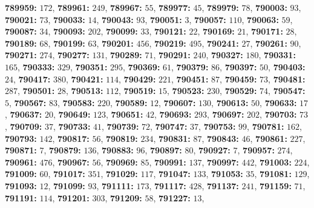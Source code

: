 \textsf{\bfseries 789959:} $172$, \textsf{\bfseries 789961:} $249$, \textsf{\bfseries 789967:} $55$, \textsf{\bfseries 789977:} $45$, \textsf{\bfseries 789979:} $78$, \textsf{\bfseries 790003:} $93$, \textsf{\bfseries 790021:} $73$, \textsf{\bfseries 790033:} $14$, \textsf{\bfseries 790043:} $93$, \textsf{\bfseries 790051:} $3$, \textsf{\bfseries 790057:} $110$, \textsf{\bfseries 790063:} $59$, \textsf{\bfseries 790087:} $34$, \textsf{\bfseries 790093:} $202$, \textsf{\bfseries 790099:} $33$, \textsf{\bfseries 790121:} $22$, \textsf{\bfseries 790169:} $21$, \textsf{\bfseries 790171:} $28$, \textsf{\bfseries 790189:} $68$, \textsf{\bfseries 790199:} $63$, \textsf{\bfseries 790201:} $456$, \textsf{\bfseries 790219:} $495$, \textsf{\bfseries 790241:} $27$, \textsf{\bfseries 790261:} $90$, \textsf{\bfseries 790271:} $274$, \textsf{\bfseries 790277:} $131$, \textsf{\bfseries 790289:} $71$, \textsf{\bfseries 790291:} $240$, \textsf{\bfseries 790327:} $180$, \textsf{\bfseries 790331:} $165$, \textsf{\bfseries 790333:} $329$, \textsf{\bfseries 790351:} $295$, \textsf{\bfseries 790369:} $61$, \textsf{\bfseries 790379:} $86$, \textsf{\bfseries 790397:} $50$, \textsf{\bfseries 790403:} $24$, \textsf{\bfseries 790417:} $380$, \textsf{\bfseries 790421:} $114$, \textsf{\bfseries 790429:} $221$, \textsf{\bfseries 790451:} $87$, \textsf{\bfseries 790459:} $73$, \textsf{\bfseries 790481:} $287$, \textsf{\bfseries 790501:} $28$, \textsf{\bfseries 790513:} $112$, \textsf{\bfseries 790519:} $15$, \textsf{\bfseries 790523:} $230$, \textsf{\bfseries 790529:} $74$, \textsf{\bfseries 790547:} $5$, \textsf{\bfseries 790567:} $83$, \textsf{\bfseries 790583:} $220$, \textsf{\bfseries 790589:} $12$, \textsf{\bfseries 790607:} $130$, \textsf{\bfseries 790613:} $50$, \textsf{\bfseries 790633:} $17$, \textsf{\bfseries 790637:} $20$, \textsf{\bfseries 790649:} $123$, \textsf{\bfseries 790651:} $42$, \textsf{\bfseries 790693:} $293$, \textsf{\bfseries 790697:} $202$, \textsf{\bfseries 790703:} $73$, \textsf{\bfseries 790709:} $37$, \textsf{\bfseries 790733:} $41$, \textsf{\bfseries 790739:} $72$, \textsf{\bfseries 790747:} $37$, \textsf{\bfseries 790753:} $99$, \textsf{\bfseries 790781:} $162$, \textsf{\bfseries 790793:} $142$, \textsf{\bfseries 790817:} $56$, \textsf{\bfseries 790819:} $234$, \textsf{\bfseries 790831:} $87$, \textsf{\bfseries 790843:} $46$, \textsf{\bfseries 790861:} $227$, \textsf{\bfseries 790871:} $7$, \textsf{\bfseries 790879:} $136$, \textsf{\bfseries 790883:} $96$, \textsf{\bfseries 790897:} $80$, \textsf{\bfseries 790927:} $7$, \textsf{\bfseries 790957:} $274$, \textsf{\bfseries 790961:} $476$, \textsf{\bfseries 790967:} $56$, \textsf{\bfseries 790969:} $85$, \textsf{\bfseries 790991:} $137$, \textsf{\bfseries 790997:} $442$, \textsf{\bfseries 791003:} $224$, \textsf{\bfseries 791009:} $60$, \textsf{\bfseries 791017:} $351$, \textsf{\bfseries 791029:} $117$, \textsf{\bfseries 791047:} $133$, \textsf{\bfseries 791053:} $35$, \textsf{\bfseries 791081:} $129$, \textsf{\bfseries 791093:} $12$, \textsf{\bfseries 791099:} $93$, \textsf{\bfseries 791111:} $173$, \textsf{\bfseries 791117:} $428$, \textsf{\bfseries 791137:} $241$, \textsf{\bfseries 791159:} $71$, \textsf{\bfseries 791191:} $114$, \textsf{\bfseries 791201:} $303$, \textsf{\bfseries 791209:} $58$, \textsf{\bfseries 791227:} $13$, 
